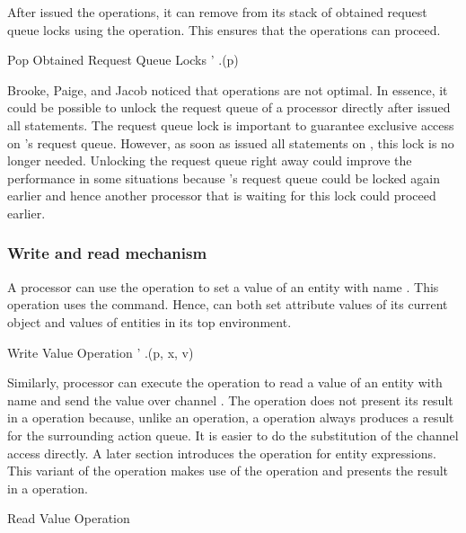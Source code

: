 After  issued the  operations, it can remove  from its stack of obtained request queue locks using the  operation. This ensures that the  operations can proceed.

\singlelineinferencerule
	{Pop Obtained Request Queue Locks}
	{
		\state' \mathematicaldefinition \state.\popobtainedrequestqueuelocksfeature(p)
	}
	{}
	{}
 
Brooke, Paige, and Jacob \cite{brooke-paige-jacob:2007:formal_semantics_for_SCOOP} noticed that  operations are not optimal. In essence, it could be possible to unlock the request queue of a processor  directly after  issued all statements. The request queue lock is important to guarantee exclusive access on 's request queue. However, as soon as  issued all statements on , this lock is no longer needed. Unlocking the request queue right away could improve the performance in some situations because 's request queue could be locked again earlier and hence another processor that is waiting for this lock could proceed earlier.

\subsubsection{Write and read mechanism}
A processor  can use the  operation to set a value  of an entity with name . This operation uses the  command. Hence,  can both set attribute values of its current object and values of entities in its top environment.

\singlelineinferencerule
	{Write Value Operation}
	{\state' \mathematicaldefinition \state.\setvaluefeature(p, x, v)}
	{}
	{}

 
Similarly, processor  can execute the  operation to read a value of an entity with name  and send the value over channel . The  operation does not present its result in a  operation because, unlike an  operation, a  operation always produces a result for the surrounding action queue. It is easier to do the substitution of the channel access directly. A later section introduces the  operation for entity expressions. This variant of the  operation makes use of the  operation and presents the result in a  operation.

\singlelineinferencerule
	{Read Value Operation}
	{}
	{}
	{}
 

